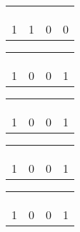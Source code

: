 \documentclass[fleqn]{article}
\begin{document}
\begin{tabular}{ | c | c | c | c  | }
\cline{1-1}
\\\cline{1-2}
 & \\\cline{1-3}
 &  &  \\\cline{1-4}
 &  &  &  \\
\hline 1 & 1 & 0 & 0  \\
\hline

\end{tabular}

\vspace{0.5in}





\begin{tabular}{ | c | c | c | c  | }
\cline{1-1}
\\\cline{1-2}
 & \\\cline{1-3}
 &  &  \\\cline{1-4}
 &  &  &  \\
\hline 1 & 0 & 0 & 1  \\
\hline

\end{tabular}
\vspace{0.5in}

\begin{tabular}{ | c | c | c | c  | }
\cline{1-1}
\\\cline{1-2}
 & \\\cline{1-3}
 &  &  \\\cline{1-4}
 &  &  &  \\
\hline 1 & 0 & 0 & 1  \\
\hline

\end{tabular}
\vspace{0.5in}

\begin{tabular}{ | c | c | c | c  | }
\cline{1-1}
\\\cline{1-2}
 & \\\cline{1-3}
 &  &  \\\cline{1-4}
 &  &  &  \\
\hline 1 & 0 & 0 & 1  \\
\hline

\end{tabular}
\vspace{0.5in}


\vspace{0.5in}

\begin{tabular}{ | c | c | c | c  | }
\cmidrule{1-1}
\\\cmidrule{1-2}
 &  \\\cmidrule{1-3}
 &  &  \\\cmidrule{1-4}
 &  &  &  \\\cmidrule{1-4}
 1 & 0 & 0 & 1  \\
\hline

\end{tabular}
\vspace{0.5in}
\end{document}

